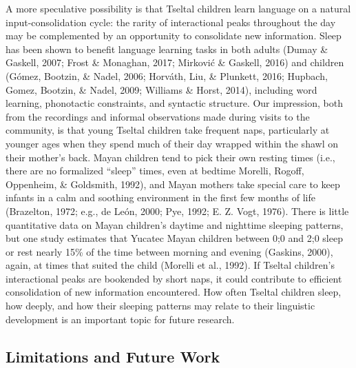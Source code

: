 \documentclass[floatsintext,man]{apa6}
\theoremstyle{definition}
\theoremstyle{definition}
\theoremstyle{definition}
\theoremstyle{remark}
\begin{document}
A more speculative possibility is that Tseltal children learn language
on a natural input-consolidation cycle: the rarity of interactional
peaks throughout the day may be complemented by an opportunity to
consolidate new information. Sleep has been shown to benefit language
learning tasks in both adults (Dumay \& Gaskell, 2007; Frost \&
Monaghan, 2017; Mirković \& Gaskell, 2016) and children (Gómez, Bootzin,
\& Nadel, 2006; Horváth, Liu, \& Plunkett, 2016; Hupbach, Gomez,
Bootzin, \& Nadel, 2009; Williams \& Horst, 2014), including word
learning, phonotactic constraints, and syntactic structure. Our
impression, both from the recordings and informal observations made
during visits to the community, is that young Tseltal children take
frequent naps, particularly at younger ages when they spend much of
their day wrapped within the shawl on their mother's back. Mayan
children tend to pick their own resting times (i.e., there are no
formalized ``sleep'' times, even at bedtime Morelli, Rogoff, Oppenheim,
\& Goldsmith, 1992), and Mayan mothers take special care to keep infants
in a calm and soothing environment in the first few months of life
(Brazelton, 1972; e.g., de León, 2000; Pye, 1992; E. Z. Vogt, 1976).
There is little quantitative data on Mayan children's daytime and
nighttime sleeping patterns, but one study estimates that Yucatec Mayan
children between 0;0 and 2;0 sleep or rest nearly 15\% of the time
between morning and evening (Gaskins, 2000), again, at times that suited
the child (Morelli et al., 1992). If Tseltal children's interactional
peaks are bookended by short naps, it could contribute to efficient
consolidation of new information encountered. How often Tseltal children
sleep, how deeply, and how their sleeping patterns may relate to their
linguistic development is an important topic for future research.

\subsection{Limitations and Future Work}\label{disc-limfut}
\end{document}
